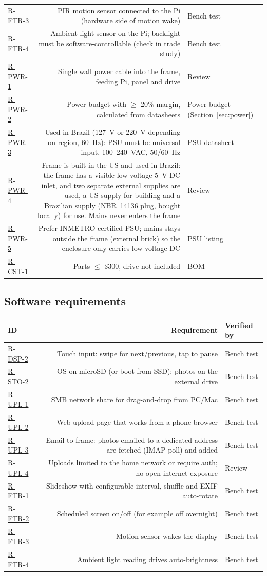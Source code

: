 \documentclass[11pt,a4paper]{article}
\newcommand{\issue}[1]{\href{https://github.com/ZacharyManzali/pictureFrame/issues?q=#1}{#1}}
\begin{document}
\begin{longtable}{l R V}
\issue{R-FTR-3} & PIR motion sensor connected to the Pi (hardware side of motion wake) & Bench test \\
\issue{R-FTR-4} & Ambient light sensor on the Pi; backlight must be software-controllable (check in trade study) & Bench test \\
\issue{R-PWR-1} & Single wall power cable into the frame, feeding Pi, panel and drive & Review \\
\issue{R-PWR-2} & Power budget with $\ge$ 20\% margin, calculated from datasheets & Power budget (Section~\ref{sec:power}) \\
\issue{R-PWR-3} & Used in Brazil (127~V or 220~V depending on region, 60~Hz): PSU must be universal input, 100--240~VAC, 50/60~Hz & PSU datasheet \\
\issue{R-PWR-4} & Frame is built in the US and used in Brazil: the frame has a visible low-voltage 5~V DC inlet, and two separate external supplies are used, a US supply for building and a Brazilian supply (NBR~14136 plug, bought locally) for use. Mains never enters the frame & Review \\
\issue{R-PWR-5} & Prefer INMETRO-certified PSU; mains stays outside the frame (external brick) so the enclosure only carries low-voltage DC & PSU listing \\
\issue{R-CST-1} & Parts $\le$ \$300, drive not included & BOM \\
\bottomrule
\end{longtable}

\subsection{Software requirements}
\begin{longtable}{l R V}
\toprule
\textbf{ID} & \textbf{Requirement} & \textbf{Verified by} \\
\midrule\endhead
\issue{R-DSP-2} & Touch input: swipe for next/previous, tap to pause & Bench test \\
\issue{R-STO-2} & OS on microSD (or boot from SSD); photos on the external drive & Bench test \\
\issue{R-UPL-1} & SMB network share for drag-and-drop from PC/Mac & Bench test \\
\issue{R-UPL-2} & Web upload page that works from a phone browser & Bench test \\
\issue{R-UPL-3} & Email-to-frame: photos emailed to a dedicated address are fetched (IMAP poll) and added & Bench test \\
\issue{R-UPL-4} & Uploads limited to the home network or require auth; no open internet exposure & Review \\
\issue{R-FTR-1} & Slideshow with configurable interval, shuffle and EXIF auto-rotate & Bench test \\
\issue{R-FTR-2} & Scheduled screen on/off (for example off overnight) & Bench test \\
\issue{R-FTR-3} & Motion sensor wakes the display & Bench test \\
\issue{R-FTR-4} & Ambient light reading drives auto-brightness & Bench test \\
\bottomrule
\end{longtable}
\end{document}

